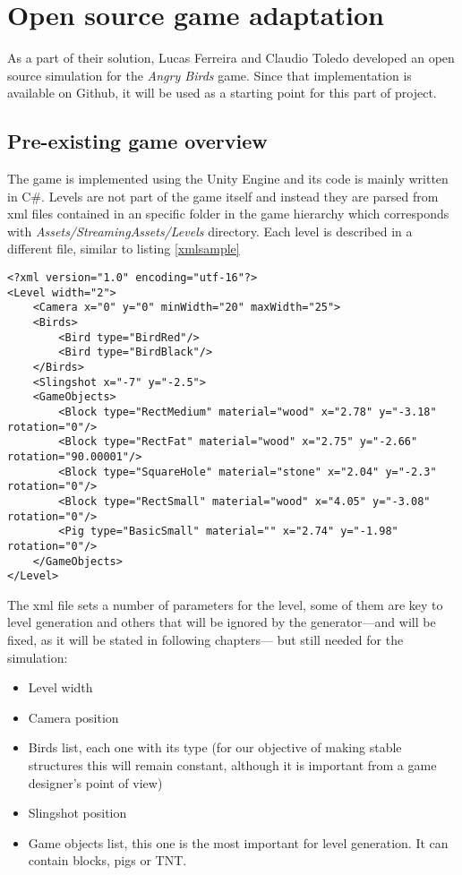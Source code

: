 \chapter{Open source game adaptation}\label{ch:gameApdaptation}
As a part of their solution, Lucas Ferreira and Claudio Toledo\cite{ferreira2014search} developed an open source simulation for the \textit{Angry Birds} game. Since that implementation is available on Github, it will be used as a starting point for this part of project.

\section{Pre-existing game overview}
The game is implemented using the Unity Engine and its code is mainly written in C\#. Levels are not part of the game itself and instead they are parsed from xml files contained in an specific folder in the game hierarchy which corresponds with \textit{Assets/StreamingAssets/Levels} directory. Each level is described in a different file, similar to listing \ref{xmlsample}
\lstset{language=XML}
\begin{lstlisting}[caption=Sample level input to show format, label=xmlsample]
<?xml version="1.0" encoding="utf-16"?>
<Level width="2">
	<Camera x="0" y="0" minWidth="20" maxWidth="25">
	<Birds>
		<Bird type="BirdRed"/>
		<Bird type="BirdBlack"/>
	</Birds>
	<Slingshot x="-7" y="-2.5">
	<GameObjects>
		<Block type="RectMedium" material="wood" x="2.78" y="-3.18" rotation="0"/>
		<Block type="RectFat" material="wood" x="2.75" y="-2.66" rotation="90.00001"/>
		<Block type="SquareHole" material="stone" x="2.04" y="-2.3" rotation="0"/>
		<Block type="RectSmall" material="wood" x="4.05" y="-3.08" rotation="0"/>
		<Pig type="BasicSmall" material="" x="2.74" y="-1.98" rotation="0"/>
	</GameObjects>
</Level>
\end{lstlisting}
The xml file sets a number of parameters for the level, some of them are key to level generation and others that will be ignored by the generator---and will be fixed, as it will be stated in following chapters--- but still needed for the simulation:
\begin{itemize}
	\item Level width 
	\item Camera position
	\item Birds list, each one with its type (for our objective of making stable structures this will remain constant, although it is important from a game designer's point of view)
	\item Slingshot position
	\item Game objects list, this one is the most important for level generation. It can contain blocks, pigs or TNT.
\end{itemize}

